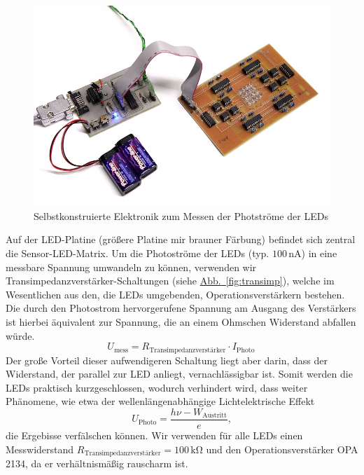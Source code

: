 \documentclass[11pt]{scrartcl}
\newcommand{\unit}[1]{\ensuremath{\,\mathrm{#1}}} %
\newcommand{\hypref}[2]{\hyperref[#2]{{#1}~\ref{#2}}}
\begin{document}
\begin{figure}[h]
\begin{center}
\includegraphics[width=1.\textwidth]{platinen.jpg}
\end{center}
\vspace{-1.5\baselineskip}
\caption{Selbstkonstruierte Elektronik zum Messen der Photströme der LEDs}
\label{fig:electronics}
\end{figure}

Auf der LED-Platine (größere Platine mir brauner Färbung) befindet sich zentral die Sensor-LED-Matrix.
Um die Photoströme der LEDs (typ. $100 \unit{nA}$) in eine messbare Spannung umwandeln zu können, verwenden wir Transimpedanzverstärker-Schaltungen (siehe \hypref{Abb.}{fig:transimp}), welche im Wesentlichen aus den, die LEDs umgebenden, Operationsverstärkern bestehen.
Die durch den Photostrom hervorgerufene Spannung am Ausgang des Verstärkers ist hierbei äquivalent zur Spannung, die an einem Ohmschen Widerstand abfallen würde.
\begin{equation*}
U_{\text{mess}} = R_{\text{Transimpedanzverstärker}} \cdot I_{\text{Photo}}\,
\end{equation*}
Der große Vorteil dieser aufwendigeren Schaltung liegt aber darin, dass der Widerstand, der parallel zur LED anliegt, vernachlässigbar ist. Somit werden die LEDs praktisch kurzgeschlossen, wodurch verhindert wird, dass weiter Phänomene, wie etwa der wellenlängenabhängige Lichtelektrische Effekt
\begin{equation*}
U_{\text{Photo}} = \frac {h \nu - W_{\text{Austritt}}} {e},
\end{equation*}
die Ergebisse verfälschen können. Wir verwenden für alle LEDs einen Messwiderstand $R_{\text{Transimpedanzverstärker}} = 100 \unit{k \Omega}$ und den Operationsverstärker OPA 2134, da er verhältnismäßig rauscharm ist. 
\end{document}
